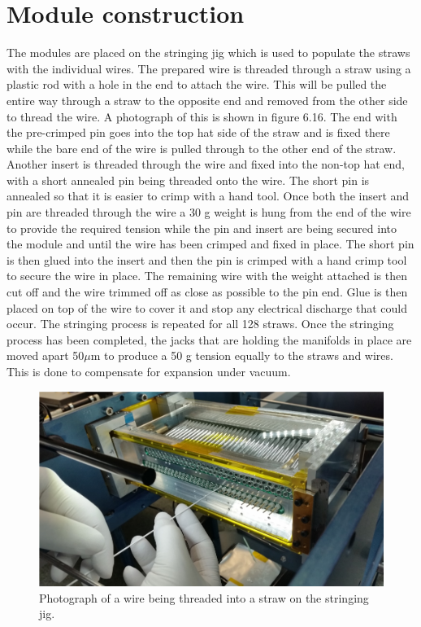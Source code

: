 \section{Module construction}

The modules are placed on the stringing jig which is used to populate the straws with the individual wires. The prepared wire is threaded through a straw using a plastic rod with a hole in the end to attach the wire. This will be pulled the entire way through a straw to the opposite end and removed from the other side to thread the wire. A photograph of this is shown in figure 6.16. The end with the pre-crimped pin goes into the top hat side of the straw and is fixed there while the bare end of the wire is pulled through to the other end of the straw. Another insert is threaded through the wire and fixed into the non-top hat end, with a short annealed pin being threaded onto the wire. The short pin is annealed so that it is easier to crimp with a hand tool. Once both the insert and pin are threaded through the wire a 30 g weight is hung from the end of the wire to provide the required tension while the pin and insert are being secured into the module and until the wire has been crimped and fixed in place. The short pin is then glued into the insert and then the pin is crimped with a hand crimp tool to secure the wire in place. The remaining wire with the weight attached is then cut off and the wire trimmed off as close as possible to the pin end. Glue is then placed on top of the wire to cover it and stop any electrical discharge that could occur. The stringing process is repeated for all 128 straws. Once the stringing process has been completed, the jacks that are holding the manifolds in place are moved apart 50$\mu$m to produce a 50 g tension equally to the straws and wires. This is done to compensate for expansion under vacuum.
\begin{figure}[!h]
\centering
\includegraphics[scale=0.85]{Figures/string}
\decoRule
\caption{Photograph of a wire being threaded into a straw on the stringing jig.}
\label{fig:string}
\end{figure}

